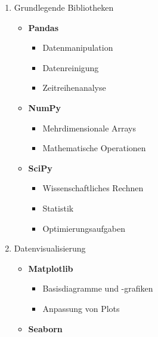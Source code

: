 \documentclass{vorlage-design-main}
\begin{document}
\begin{enumerate}
\def\labelenumi{\arabic{enumi}.}

\item
  Grundlegende Bibliotheken

  \begin{itemize}

  \item
    \textbf{Pandas}

    \begin{itemize}

    \item
      Datenmanipulation
    \item
      Datenreinigung
    \item
      Zeitreihenanalyse
    \end{itemize}
  \item
    \textbf{NumPy}

    \begin{itemize}

    \item
      Mehrdimensionale Arrays
    \item
      Mathematische Operationen
    \end{itemize}
  \item
    \textbf{SciPy}

    \begin{itemize}

    \item
      Wissenschaftliches Rechnen
    \item
      Statistik
    \item
      Optimierungsaufgaben
    \end{itemize}
  \end{itemize}
\item
  Datenvisualisierung

  \begin{itemize}

  \item
    \textbf{Matplotlib}

    \begin{itemize}

    \item
      Basisdiagramme und -grafiken
    \item
      Anpassung von Plots
    \end{itemize}
  \item
    \textbf{Seaborn}

    \begin{itemize}


\end{itemize}
\end{itemize}
\end{enumerate}
\end{document}
